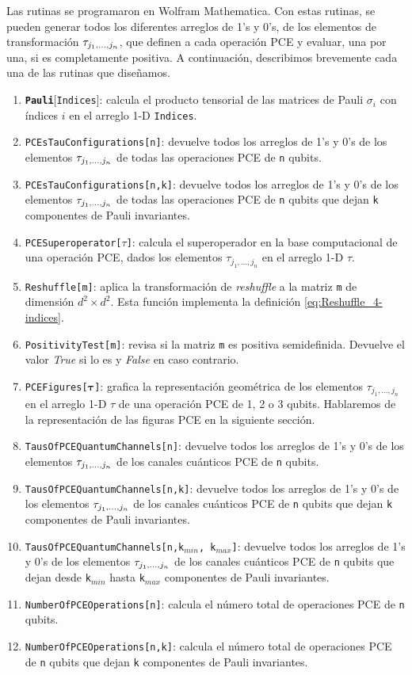 Las rutinas se programaron en Wolfram Mathematica.
Con estas rutinas, se pueden generar
todos los diferentes arreglos de 1's y 0's, de los elementos de 
transformación $\tau_{j_1,\ldots ,j_n}$,
que definen a cada operación PCE y evaluar, una por una, si
es completamente positiva.
A continuación, describimos brevemente cada una de las rutinas que diseñamos.
\begin{enumerate}
	\item \textbf{\texttt{Pauli}}[\texttt{Indices}]: calcula el producto tensorial 
	de las matrices 	de Pauli $\sigma_i$ con índices $i$ en el 
	arreglo 1-D \texttt{Indices}.
	\item \texttt{PCEsTauConfigurations[n]}: devuelve todos
	los arreglos de 1's y 0's de los elementos $\tau_{j_1,\ldots ,j_n}$
	de todas las operaciones PCE de \texttt{n} qubits.
	\item \texttt{PCEsTauConfigurations[n,k]}: devuelve todos 
	los arreglos de 1's y 0's de los elementos $\tau_{j_1,\ldots ,j_n}$
	de todas las operaciones PCE de \texttt{n} qubits que dejan \texttt{k} 
	componentes de Pauli invariantes.
	\item \texttt{PCESuperoperator[$\tau$]}: calcula el superoperador en 
	la base computacional de una operación PCE, dados los elementos
	$\tau_{j_1,\ldots,j_n}$	en el arreglo 1-D $\tau$.	
	\item \texttt{Reshuffle[m]}: aplica la transformación de 
	\textit{reshuffle} a la matriz \texttt{m} de dimensión $d^2\times d^2$.
	Esta función implementa la definición \eqref{eq:Reshuffle_4-indices}.
	\item \texttt{PositivityTest[m]}: revisa si la matriz \texttt{m}
	es positiva semidefinida. Devuelve el valor \textit{True} si lo es y 
	\textit{False} en caso contrario. 
	\item \texttt{PCEFigures[$\boldsymbol{\tau}$]}: grafica la representación 
	geométrica de los elementos $\tau_{j_1,\ldots,j_n}$ en el arreglo 
	1-D $\tau$ de una operación PCE de 1, 2 o 3 qubits. Hablaremos 
	de la representación de las figuras PCE en la siguiente sección.
	\item \texttt{TausOfPCEQuantumChannels[n]}: 
	devuelve todos los arreglos de 1's y 0's de los elementos 
	$\tau_{j_1,\ldots ,j_n}$ de los canales 	cuánticos PCE de \texttt{n} qubits.
	\item \texttt{TausOfPCEQuantumChannels[n,k]}: 
	devuelve todos los arreglos de 1's y 0's de los elementos 
	$\tau_{j_1,\ldots ,j_n}$ de los canales cuánticos PCE de \texttt{n} qubits que dejan \texttt{k}
	componentes de Pauli invariantes.
	\item \texttt{TausOfPCEQuantumChannels[n,k${}_{min}$,
	k${}_{max}$]}: 
	devuelve todos los arreglos de 1's y 0's de los elementos 
	$\tau_{j_1,\ldots ,j_n}$ de los canales cuánticos PCE de \texttt{n} qubits que dejan desde 
	\texttt{k}${}_{min}$ hasta \texttt{k}${}_{max}$	componentes de Pauli invariantes.
	\item \texttt{NumberOfPCEOperations[n]}: calcula 
	el número total de operaciones PCE de \texttt{n} qubits. 
	\item \texttt{NumberOfPCEOperations[n,k]}: calcula 
	el número total de operaciones PCE de \texttt{n} qubits que dejan \texttt{k}
	componentes de Pauli invariantes. 	
\end{enumerate}

